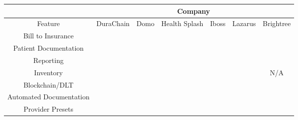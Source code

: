 \usepackage[table,xcdraw]{xcolor}
\usepackage{amssymb}%
\usepackage{pifont}%
\newcommand{\cmark}{\ding{51}}%
\newcommand{\xmark}{\ding{55}}%

\begin{table}[]
\begin{tabular}{c|l|c|c|c|c|c|}
\cline{2-7}
 & \multicolumn{6}{c|}{Company} \\ \hline
\multicolumn{1}{|c|}{Feature} & DuraChain & Domo & Health Splash & Iboss & Lazarus & Brightree \\ \hline
\multicolumn{1}{|c|}{Bill to Insurance} & \cellcolor[HTML]{EFEFEF}\cmark & \cellcolor[HTML]{9B9B9B}\xmark & \cellcolor[HTML]{9B9B9B}\xmark & \cellcolor[HTML]{9B9B9B}\xmark & \cellcolor[HTML]{9B9B9B}\xmark & \cellcolor[HTML]{EFEFEF}\cmark \\ \hline
\multicolumn{1}{|c|}{Patient Documentation} & \cellcolor[HTML]{EFEFEF}\cmark & \cellcolor[HTML]{9B9B9B}\xmark & \cellcolor[HTML]{EFEFEF}\cmark & \cellcolor[HTML]{9B9B9B}\xmark & \cellcolor[HTML]{EFEFEF}\cmark & \cellcolor[HTML]{EFEFEF}\cmark \\ \hline
\multicolumn{1}{|c|}{Reporting} & \cellcolor[HTML]{EFEFEF}\cmark & \cellcolor[HTML]{EFEFEF}\cmark & \cellcolor[HTML]{9B9B9B}\xmark & \cellcolor[HTML]{9B9B9B}\xmark & \cellcolor[HTML]{9B9B9B}\xmark & \cellcolor[HTML]{9B9B9B}\xmark \\ \hline
\multicolumn{1}{|c|}{Inventory} & \cellcolor[HTML]{EFEFEF}\cmark & \cellcolor[HTML]{9B9B9B}\xmark & \cellcolor[HTML]{9B9B9B}\xmark & \cellcolor[HTML]{EFEFEF}\cmark & \cellcolor[HTML]{9B9B9B}\xmark & \cellcolor[HTML]{FFFFFF}N/A \\ \hline
\multicolumn{1}{|c|}{Blockchain/DLT} & \cellcolor[HTML]{EFEFEF}\cmark & \cellcolor[HTML]{9B9B9B}\xmark & \cellcolor[HTML]{EFEFEF}\cmark & \cellcolor[HTML]{9B9B9B}\xmark & \cellcolor[HTML]{9B9B9B}\xmark & \cellcolor[HTML]{9B9B9B}\xmark \\ \hline
\multicolumn{1}{|c|}{Automated Documentation} & \cellcolor[HTML]{EFEFEF}\cmark & \cellcolor[HTML]{9B9B9B}\xmark & \cellcolor[HTML]{9B9B9B}\xmark & \cellcolor[HTML]{9B9B9B}\xmark & \cellcolor[HTML]{9B9B9B}\xmark & \cellcolor[HTML]{9B9B9B}\xmark \\ \hline
\multicolumn{1}{|c|}{Provider Presets} & \cellcolor[HTML]{EFEFEF}\cmark & \cellcolor[HTML]{9B9B9B}\xmark & \cellcolor[HTML]{9B9B9B}\xmark & \cellcolor[HTML]{9B9B9B}\xmark & \cellcolor[HTML]{9B9B9B}\xmark & \cellcolor[HTML]{9B9B9B}\xmark \\ \hline

\end{tabular}
\end{table}

